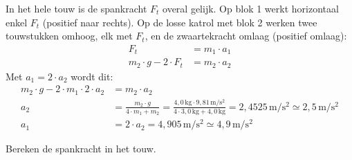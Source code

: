 \documentclass{ximera}
\newcommand{\blokje}[4][left]{\fill (#2,#3) circle (0.05); \node[#1, inner sep=3pt] at (#2,#3) {#4};}
\newcommand{\kr}[7][kracht]{\draw[#1] (#2,#3) -- ++(#4,#5) node[#6] {#7};}
\newcommand{\positiepijl}[6]{\draw[positie, draw=black!50, text=black!50] (#1,#2) -- ++(#3,#4) node[#5] {#6};}
\begin{document}
\begin{exercise}
\begin{question}
\begin{solution}
            \begin{center}
            \end{center}

            In het hele touw is de spankracht $F_{t}$ overal gelijk. Op blok 1 werkt horizontaal enkel $F_{t}$ (positief naar rechts). Op de losse katrol met blok 2 werken twee touwstukken omhoog, elk met $F_{t}$, en de zwaartekracht omlaag (positief omlaag):
            \begin{align*}
                F_{t} &= m_{1} \cdot a_{1} \\
                m_{2} \cdot g - 2 \cdot F_{t} &= m_{2} \cdot a_{2}
            \end{align*}
            Met $a_{1} = 2 \cdot a_{2}$ wordt dit:
            \begin{align*}
                m_{2} \cdot g - 2 \cdot m_{1} \cdot 2 \cdot a_{2} &= m_{2} \cdot a_{2} \\
                a_{2} &= \frac{m_{2} \cdot g}{4 \cdot m_{1} + m_{2}} = \frac{4{,}0 \, \mathrm{kg} \cdot 9{,}81 \, \mathrm{m/s^2}}{4 \cdot 3{,}0 \, \mathrm{kg} + 4{,}0 \, \mathrm{kg}} = 2{,}4525 \, \mathrm{m/s^2} \simeq \boxed{2{,}5 \, \mathrm{m/s^2}} \\
                a_{1} &= 2 \cdot a_{2} = 4{,}905 \, \mathrm{m/s^2} \simeq \boxed{4{,}9 \, \mathrm{m/s^2}}
            \end{align*}
        \end{solution}
    \end{question}

    \begin{question}
        Bereken de spankracht in het touw.


\end{question}
\end{exercise}
\end{document}
